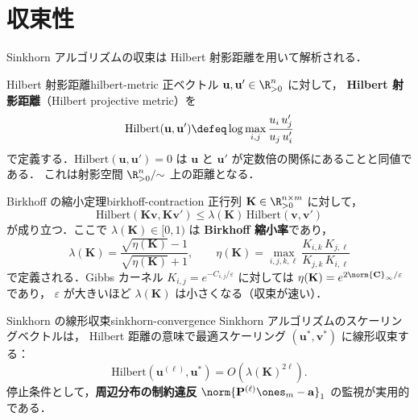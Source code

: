 \section{収束性}
\label{sec:sinkhorn-convergence}

Sinkhorn アルゴリズムの収束は Hilbert 射影距離を用いて解析される．

\begin{definition}{Hilbert 射影距離}{hilbert-metric}
  正ベクトル $\mathbf{u}, \mathbf{u}' \in \R_{>0}^n$ に対して，
  \textbf{Hilbert 射影距離}（Hilbert projective metric）を
  \[
    \mathrm{Hilbert}(\mathbf{u}, \mathbf{u}')
    \defeq \log \max_{i,j} \frac{u_i \, u'_j}{u_j \, u'_i}
  \]
  で定義する．$\mathrm{Hilbert}(\mathbf{u}, \mathbf{u}') = 0$ は
  $\mathbf{u}$ と $\mathbf{u}'$ が定数倍の関係にあることと同値である．
  これは射影空間 $\R_{>0}^n / {\sim}$ 上の距離となる．
\end{definition}

\begin{theorem}{Birkhoff の縮小定理}{birkhoff-contraction}
  正行列 $\mathbf{K} \in \R_{>0}^{n \times m}$ に対して，
  \[
    \mathrm{Hilbert}(\mathbf{K}\mathbf{v}, \mathbf{K}\mathbf{v}')
    \leq \lambda(\mathbf{K}) \, \mathrm{Hilbert}(\mathbf{v}, \mathbf{v}')
  \]
  が成り立つ．ここで $\lambda(\mathbf{K}) \in [0, 1)$ は
  \textbf{Birkhoff 縮小率}であり，
  \[
    \lambda(\mathbf{K}) = \frac{\sqrt{\eta(\mathbf{K})} - 1}{\sqrt{\eta(\mathbf{K})} + 1}, \qquad
    \eta(\mathbf{K}) = \max_{i,j,k,\ell}
    \frac{K_{i,k} \, K_{j,\ell}}{K_{j,k} \, K_{i,\ell}}
  \]
  で定義される．Gibbs カーネル $K_{i,j} = e^{-C_{i,j}/\varepsilon}$ に対しては
  $\eta(\mathbf{K}) = e^{2\norm{\mathbf{C}}_\infty / \varepsilon}$ であり，
  $\varepsilon$ が大きいほど $\lambda(\mathbf{K})$ は小さくなる（収束が速い）．
\end{theorem}

\begin{proposition}{Sinkhorn の線形収束}{sinkhorn-convergence}
  Sinkhorn アルゴリズムのスケーリングベクトルは，
  Hilbert 距離の意味で最適スケーリング $(\mathbf{u}^*, \mathbf{v}^*)$ に線形収束する：
  \[
    \mathrm{Hilbert}(\mathbf{u}^{(\ell)}, \mathbf{u}^*)
    = O(\lambda(\mathbf{K})^{2\ell}).
  \]
  停止条件として，\textbf{周辺分布の制約違反}
  $\norm{\mathbf{P}^{(\ell)} \ones_m - \mathbf{a}}_1$ の監視が実用的である．
\end{proposition}

